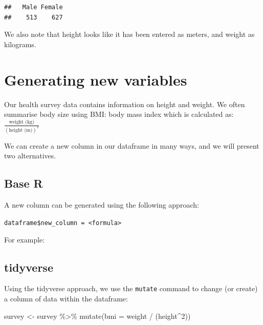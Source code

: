 \documentclass[
]{memoir}
\newenvironment{Shaded}{\begin{snugshade}}{\end{snugshade}}
\newcommand{\AttributeTok}[1]{\textcolor[rgb]{0.77,0.63,0.00}{#1}}
\newcommand{\DecValTok}[1]{\textcolor[rgb]{0.00,0.00,0.81}{#1}}
\newcommand{\FunctionTok}[1]{\textcolor[rgb]{0.00,0.00,0.00}{#1}}
\newcommand{\NormalTok}[1]{#1}
\newcommand{\OtherTok}[1]{\textcolor[rgb]{0.56,0.35,0.01}{#1}}
\newcommand{\SpecialCharTok}[1]{\textcolor[rgb]{0.00,0.00,0.00}{#1}}
\begin{document}
\begin{verbatim}
##   Male Female 
##    513    627
\end{verbatim}

We also note that height looks like it has been entered as meters, and weight as kilograms.

\hypertarget{generating-new-variables}{%
\section{Generating new variables}\label{generating-new-variables}}

Our health survey data contains information on height and weight. We often summarise body size using BMI: body mass index which is calculated as: \(\frac{\text{weight (kg)}}{(\text{height (m)})^2}\)

We can create a new column in our dataframe in many ways, and we will present two alternatives.

\hypertarget{base-r}{%
\subsection{Base R}\label{base-r}}

A new column can be generated using the following approach:

\texttt{dataframe\$new\_column\ =\ \textless{}formula\textgreater{}}

For example:

\begin{Shaded}
\end{Shaded}

\hypertarget{tidyverse}{%
\subsection{tidyverse}\label{tidyverse}}

Using the tidyverse approach, we use the \texttt{mutate} command to change (or create) a column of data within the dataframe:

\begin{Shaded}
\begin{Highlighting}[]
\NormalTok{survey }\OtherTok{\textless{}{-}}\NormalTok{ survey }\SpecialCharTok{\%\textgreater{}\%} 
  \FunctionTok{mutate}\NormalTok{(}\AttributeTok{bmi =}\NormalTok{ weight }\SpecialCharTok{/}\NormalTok{ (height}\SpecialCharTok{\^{}}\DecValTok{2}\NormalTok{))}
\end{Highlighting}
\end{Shaded}
\end{document}
